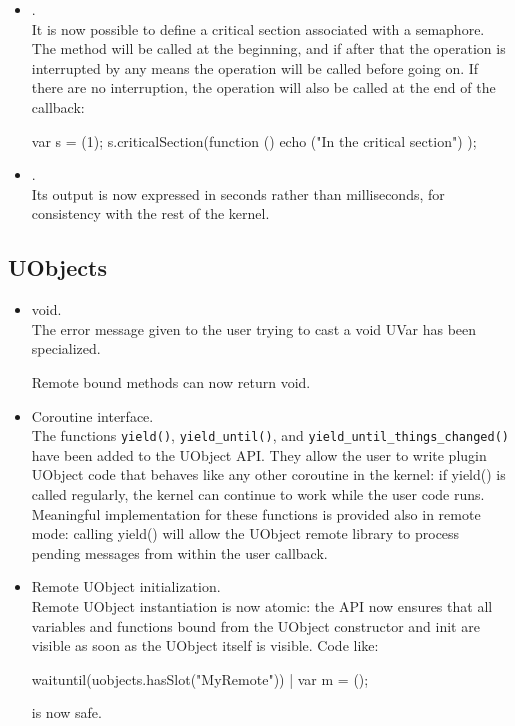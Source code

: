 \begin{itemize}
\item {}.\\
  It is now possible to define a critical section associated with a
  semaphore. The  method will be called at the
  beginning, and if after that the operation is interrupted by any means the
   operation will be called before going on. If
  there are no interruption, the  operation will
  also be called at the end of the callback:

\begin{urbiunchecked}
var s = (1);
s.criticalSection(function () { echo ("In the critical section") });
\end{urbiunchecked}

\item {}.\\
  Its output is now expressed in seconds rather than milliseconds, for
  consistency with the rest of the kernel.
\end{itemize}

\subsection{UObjects}

\begin{itemize}
\item void.\\
  The error message given to the user trying to cast a void UVar has been
  specialized.

  Remote bound methods can now return void.


\item Coroutine interface.\\
  The functions \lstinline|yield()|, \lstinline|yield_until()|, and
  \lstinline|yield_until_things_changed()| have been added to the UObject
  API. They allow the user to write plugin UObject code that behaves like
  any other coroutine in the kernel: if yield() is called regularly, the
  kernel can continue to work while the user code runs.  Meaningful
  implementation for these functions is provided also in remote mode:
  calling yield() will allow the UObject remote library to process pending
  messages from within the user callback.

\item Remote UObject initialization.\\
  Remote UObject instantiation is now atomic: the API now ensures that all
  variables and functions bound from the UObject constructor and init are
  visible as soon as the UObject itself is visible. Code like:

\begin{urbiunchecked}
waituntil(uobjects.hasSlot("MyRemote")) | var m = ();
\end{urbiunchecked}

\noindent
is now safe.
\end{itemize}

